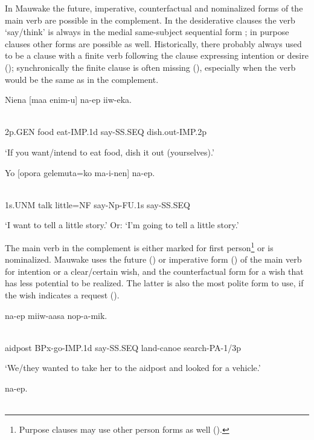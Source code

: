 In Mauwake the future, imperative, counterfactual and nominalized forms of the main verb are possible in the complement. In the desiderative clauses the verb  `say/think' is always in the medial same-subject sequential form ; in purpose clauses other forms are possible as well. Historically, there probably always used to be a clause with a finite verb following the clause expressing intention or desire (); synchronically the finite clause is often missing (), especially when the verb would be the same as in the complement.

\ea%
\label{ex:x367}
\gll Niena  [maa  enim-u]  na-ep  iiw-eka. \\
      \\
\glt
\z

2p.GEN  food  eat-IMP.1d  say-SS.SEQ  dish.out-IMP.2p

`If you want/intend to eat food, dish it out (yourselves).'

\ea%
\label{ex:x368}
\gll Yo  [opora  gelemuta=ko  ma-i-nen]  na-ep. \\
      \\
\glt
\z

1s.UNM  talk  little=NF  say-Np-FU.1s  say-SS.SEQ

`I want to tell a little story.' Or: `I'm going to tell a little story.'

The main verb in the complement is either marked for first person\footnote{Purpose clauses may use other person forms as well ().} or is nominalized. Mauwake uses the future () or imperative form () of the main verb for intention or a clear/certain wish, and the counterfactual form for a wish that has less potential to be realized. The latter is also the most polite form to use, if the wish indicates a request (). 

\ea%
\label{ex:x369}
\gll [Haussik  p-ek-u]  na-ep  miiw-aasa  nop-a-mik. \\
      \\
\glt
\z

aidpost  BPx-go-IMP.1d  say-SS.SEQ  land-canoe  search-PA-1/3p

`We/they wanted to take her to the aidpost and looked for a vehicle.'

\ea%
\label{ex:x370}
\gll [Yo=ko  wia  uruf-ek-a-m]  na-ep.  \\
      \\
\glt
\z


